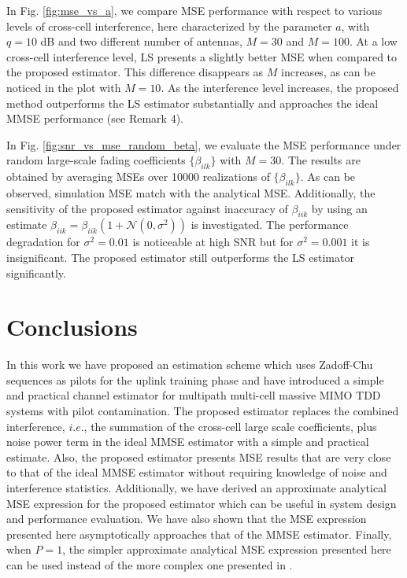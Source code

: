 \documentclass[journal,12pt,onecolumn]{IEEEtran}
\begin{document}
In Fig. \ref{fig:mse_vs_a}, we compare MSE performance with respect to various levels of cross-cell interference, here characterized by the parameter $a$, with $q = 10$ dB and two different number of antennas, $M = 30$ and $M = 100$. At a low cross-cell interference level, LS presents a slightly better MSE when compared to the proposed estimator. This difference disappears as $M$ increases, as can be noticed in the plot with $M=10$. As the interference level increases, the proposed method outperforms the LS estimator substantially and approaches the ideal MMSE performance (see Remark 4).

In Fig. \ref{fig:snr_vs_mse_random_beta}, we evaluate the MSE performance under random large-scale fading coefficients $\{\beta_{ilk}\}$ with $M=30$. The results are obtained by averaging MSEs over 10000 realizations of $\{\beta_{ilk}\}$. As can be observed, simulation MSE match with the analytical MSE. Additionally, the sensitivity of the proposed estimator against inaccuracy of $\beta_{iik}$ by using an estimate $\beta_{iik} = \beta_{iik}(1 + \mathcal{N}(0,\sigma^{2}))$ is investigated. The performance degradation for $\sigma^{2} = 0.01$ is noticeable at high SNR but for $\sigma^{2} = 0.001$ it is insignificant. The proposed estimator still outperforms the LS estimator significantly.

\section{Conclusions}

In this work we have proposed an estimation scheme which uses Zadoff-Chu sequences as pilots for the uplink training phase and have introduced a simple and practical channel estimator for multipath multi-cell massive MIMO TDD systems with pilot contamination. The proposed estimator replaces the combined interference, $i.e.$, the summation of the cross-cell large scale coefficients, plus noise power term in the ideal MMSE estimator with a simple and practical estimate. Also, the proposed estimator presents MSE results that are very close to that of the ideal MMSE estimator without requiring knowledge of noise and interference statistics. Additionally, we have derived an approximate analytical MSE expression for the proposed estimator which can be useful in system design and performance evaluation. We have also shown that the MSE expression presented here asymptotically approaches that of the MMSE estimator. Finally, when $P = 1$, the simpler approximate analytical MSE expression presented here can be used instead of the more complex one presented in \cite{Amin:channelEstPilotCont}. 
\end{document}
